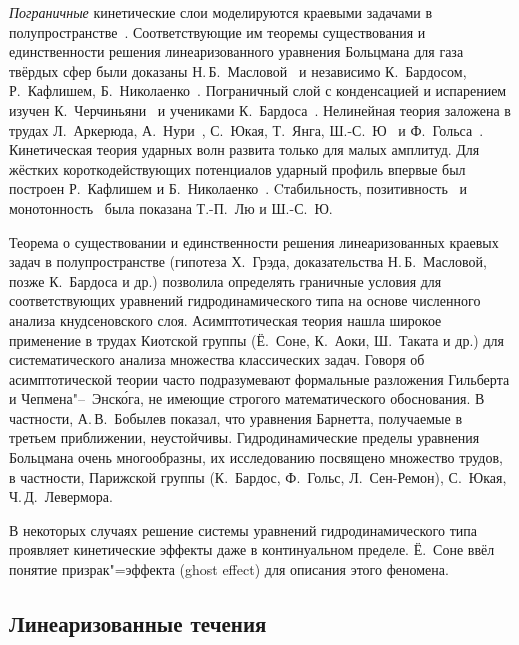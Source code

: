 \emph{Пограничные} кинетические слои моделируются краевыми задачами в полупространстве~\autocite{Grad1969}.
Соответствующие им теоремы существования и единственности решения линеаризованного уравнения Больцмана для газа твёрдых сфер
были доказаны Н.\,Б.~Масловой~\autocite{Maslova1982} и независимо К.~Бардосом, Р.~Кафлишем, Б.~Николаенко~\autocite{Bardos1986}.
Пограничный слой с конденсацией и испарением изучен К.~Черчиньяни~\autocite{Cercignani1986}
и учениками К.~Бардоса~\autocite{Coron1988}.
Нелинейная теория заложена в трудах Л.~Аркерюда, А.~Нури~\autocite{Arkeryd2000},
С.~Юкая, Т.~Янга, Ш.-С.~Ю~\autocite{Ukai2003} и Ф.~Гольса~\autocite{Golse2008}.
Кинетическая теория ударных волн развита только для малых амплитуд.
Для жёстких короткодействующих потенциалов ударный профиль впервые был построен Р.~Кафлишем и Б.~Николаенко~\autocite{Caflisch1982}.
Cтабильность, позитивность~\autocite{Liu2004} и монотонность~\autocite{Liu2013} была показана Т.-П.~Лю и Ш.-С.~Ю.


Теорема о существовании и единственности решения линеаризованных краевых задач в полупространстве
(гипотеза Х.~Грэда, доказательства Н.\,Б.~Масловой, позже К.~Бардоса и др.)
позволила определять граничные условия для соответствующих уравнений гидродинамического типа
на основе численного анализа кнудсеновского слоя.
Асимптотическая теория нашла широкое применение в трудах Киотской группы
(Ё.~Соне, К.~Аоки, Ш.~Таката и др.) для систематического анализа множества классических задач.
Говоря об асимптотической теории часто подразумевают формальные разложения Гильберта и Чепмена"--~Энск\'{о}га,
не имеющие строгого математического обоснования. В частности, А.\,В.~Бобылев показал,
что уравнения Барнетта, получаемые в третьем приближении, неустойчивы.
Гидродинамические пределы уравнения Больцмана очень многообразны, их исследованию
посвящено множество трудов, в частности, Парижской группы (К.~Бардос, Ф.~Гольс, Л.~Сен-Ремон),
С.~Юкая, Ч.\,Д.~Левермора.

В некоторых случаях решение системы уравнений гидродинамического типа
проявляет кинетические эффекты даже в континуальном пределе.
Ё.~Соне ввёл понятие призрак"=эффекта (ghost effect) для описания этого феномена.


\subsection{Линеаризованные течения}

